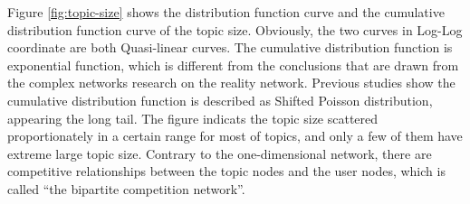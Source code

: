 \documentclass{elsarticle}
\begin{document}
Figure \ref{fig:topic-size} shows the distribution function curve and the cumulative
distribution function curve of the topic size. Obviously, the two
curves in Log-Log coordinate are both Quasi-linear curves. 
The cumulative distribution function is exponential function,
which is different from the conclusions that are drawn from the
complex networks research on the reality network. Previous studies show
the cumulative distribution function is described as Shifted Poisson
distribution, appearing the long tail. The figure indicats the topic
size scattered proportionately in a certain range for most of topics,
and only a few of them have extreme large topic size. Contrary to the
one-dimensional network, there are competitive relationships between the topic nodes and the user nodes, which is called “the bipartite competition network”. 
\end{document}

